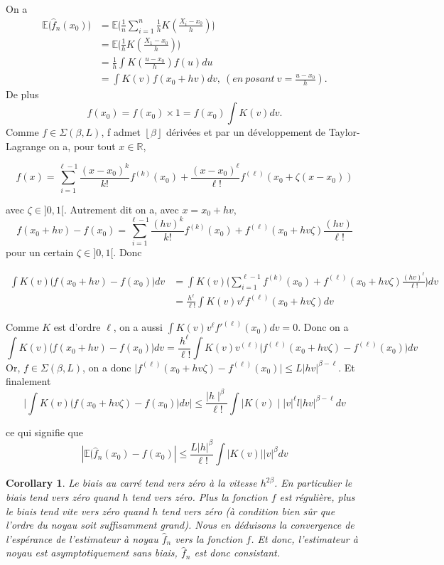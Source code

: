 \documentclass[
]{book}
\newtheorem{corollary}{Corollary}[chapter]
\theoremstyle{definition}
\theoremstyle{definition}
\theoremstyle{definition}
\theoremstyle{definition}
\theoremstyle{remark}
\begin{document}
\begin{demo} On a
$$
\begin{aligned}
\mathbb E\lgroup \hat f_n(x_0) \rgroup&=\mathbb E\lgroup\frac{1}{n}\sum_{i=1}^n \frac{1}{h}K(\frac{X_i-x_0}{h})\rgroup \\
&=\mathbb E\lgroup \frac{1}{h}K(\frac{X_1-x_0}{h})\rgroup \\
&=\frac{1}{h}\int K(\frac{u-x_0}{h})f(u)du  \\
&=\int K(v)f(x_0+hv)dv,\  (en\ posant\ v=\frac{u-x_0}{h}).
\end{aligned}
$$
De plus
$$
f(x_0)=f(x_0)\times 1 = f(x_0) \int K(v)dv.
$$
Comme $f \in \Sigma(\beta, L)$, f admet $\left\lfloor{\beta} \right \rfloor$ dérivées et par un développement de Taylor-Lagrange on a, pour tout $x \in \mathbb R$,

$$
f(x)= \sum_{i=1}^{\ell-1}\frac{(x-x_0)^k}{k!}f^{(k)}(x_0)+\frac{(x-x_0)^\ell}{\ell!}f^{(\ell)}(x_0+\zeta (x-x_0))
$$  

avec $\zeta \in ]0,1[$. Autrement dit on a, avec $x= x_0+hv$,
$$
f(x_0+hv)-f(x_0)=\sum_{i=1}^{\ell-1}\frac{(hv)^k}{k!}f^{(k)}(x_0)+f^{(\ell)}(x_0+hv\zeta)\frac{(hv)}{\ell !}
$$  
pour un certain $\zeta \in ]0,1[$. Donc

$$
\begin{aligned}
\int K(v)\lgroup f(x_0+hv)-f(x_0)\rgroup dv &= \int K(v)\lgroup\sum_{i=1}^{\ell - 1}f^{(k)}(x_0)+f^{(\ell)}(x_0+hv\zeta)\frac{(hv)^{\ell}}{\ell !}\rgroup dv \\
&=\frac{h^{\ell}}{\ell !}\int K(v)v^{\ell}f^{(\ell)}(x_0+hv\zeta)dv
\end{aligned}
$$

Comme $K$ est d'ordre $\ell$, on a aussi $\int K(v)v^{\ell}f'^(\ell)(x_0)dv=0$. Donc on a
$$
\int K(v)\lgroup f(x_0+hv)-f(x_0)\rgroup dv = \frac{h^{\ell}}{\ell !}\int K(v)v^{(\ell)}\lgroup f^{(\ell)}(x_0 + hv\zeta)-f^{(\ell)}(x_0)\rgroup dv
$$
Or, $f \in \Sigma(\beta, L)$, on a donc $\mid f^{(\ell)}(x_0+hv\zeta)-f^{(\ell)}(x_0)\mid \leq L|hv|^{\beta-\ell}$. Et finalement
$$
\mid \int K(v)\lgroup f(x_0+hv\zeta)-f(x_0)\rgroup dv \mid \leq \frac{\mid h\mid^{\beta}}{\ell !}\int \mid K(v) \mid |v|^{\ell}l|hv|^{\beta-\ell}dv
$$

ce qui signifie que
$$
|\mathbb E \lgroup\hat f_n(x_0)-f(x_0)| \leq \frac{L|h|^{\beta}}{\ell !}\int |K(v)||v|^{\beta}dv
$$
\end{demo}
\begin{corollary}   Le biais au carré tend vers zéro à la vitesse $h^{2\beta}$. En particulier le biais tend vers zéro quand $h$ tend vers zéro. Plus la fonction $f$ est régulière, plus le biais tend vite vers zéro quand $h$ tend vers zéro (à condition bien sûr que l'ordre du noyau soit suffisamment grand). Nous en déduisons la convergence de l'espérance de l'estimateur à noyau $\hat {f}_n$ vers la fonction $f$. Et donc, l'estimateur à noyau est asymptotiquement sans biais, $\hat {f}_n$ est donc consistant.\newline
 \end{corollary}
\end{document}
